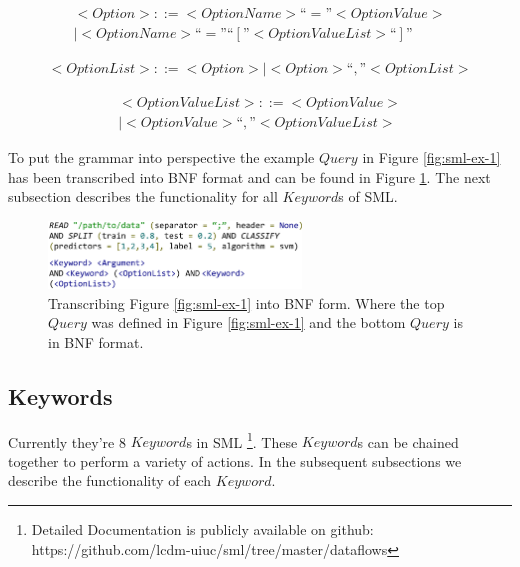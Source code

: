 \documentclass[jair,twoside,11pt,theapa]{article}
\begin{document}
\begin{equation} \label{BNF:Option}
\begin{split}
<Option> ::= <Option Name> “=” <Option Value> \\
		| <Option Name> “=” “[”<Option Value List>“]”
\end{split}
\end{equation}

\begin{equation} \label{BNF:OptionList}
\begin{split}
	<Option List> ::= <Option> | <Option> “,” <Option List>
\end{split}
\end{equation}

\begin{equation} \label{BNF:OptionValueList}
\begin{split}
<Option Value List> ::= <Option Value> \\
| <Option Value> “,” <Option Value List>
\end{split}
\end{equation}

To put the grammar into perspective the example \(Query\) in Figure \ref{fig:sml-ex-1} has been transcribed into BNF format and can be found in Figure \ref{fig:SML:BNFComp}. The next subsection describes the functionality for all  \(Keyword\)s of SML.

\begin{figure}
\includegraphics[width=0.6\textwidth]{figs/bnf_ex.png}
\centering
\caption{Transcribing Figure \ref{fig:sml-ex-1} into BNF form. Where the top \(Query\) was defined in Figure \ref{fig:sml-ex-1} and the bottom \(Query\) is in BNF format.}
\label{fig:SML:BNFComp}
\end{figure}


\subsection{Keywords}
Currently they're 8 \(Keyword\)s in SML \footnote{Detailed Documentation is publicly available on github: https://github.com/lcdm-uiuc/sml/tree/master/dataflows}. These \(Keyword\)s can be chained together to perform a variety of actions. In the subsequent subsections we describe the functionality of each \(Keyword\).
\end{document}
